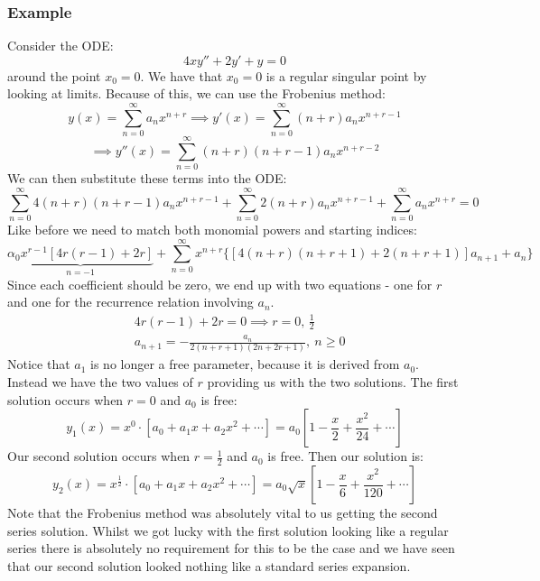 \documentclass[12pt]{article}
\begin{document}
\subsubsection*{Example}
Consider the ODE:
\[4xy''+2y'+y=0\]
around the point \(x_0=0\). We have that \(x_0=0\) is a regular singular point by looking at limits. Because of this, we can use the Frobenius method:
\[y(x)=\sum^\infty_{n=0}a_nx^{n+r}\implies y'(x)=\sum^\infty_{n=0}(n+r)a_nx^{n+r-1}\]
\[\implies y''(x)=\sum^\infty_{n=0}(n+r)(n+r-1)a_nx^{n+r-2}\]
We can then substitute these terms into the ODE:
\[\sum^\infty_{n=0}4(n+r)(n+r-1)a_nx^{n+r-1}+\sum^\infty_{n=0}2(n+r)a_nx^{n+r-1}+\sum^\infty_{n=0}a_nx^{n+r}=0\]
Like before we need to match both monomial powers and starting indices:
\[\underbrace{\alpha_0x^{r-1}[4r(r-1)+2r]}_{n=-1}+\sum^\infty_{n=0}x^{n+r}\{[4(n+r)(n+r+1)+2(n+r+1)]a_{n+1}+a_n\}\]
Since each coefficient should be zero, we end up with two equations - one for \(r\) and one for the recurrence relation involving \(a_n\).
\begin{align*}
    &4r(r-1)+2r=0\implies r=0,\,\frac{1}{2} \\
    &a_{n+1}=-\frac{a_n}{2(n+r+1)(2n+2r+1)},\ n\geq 0
\end{align*}
Notice that \(a_1\) is no longer a free parameter, because it is derived from \(a_0\). Instead we have the two values of \(r\) providing us with the two solutions. The first solution occurs when \(r=0\) and \(a_0\) is free:
\[y_1(x)=x^0\cdot[a_0+a_1x+a_2x^2+\cdots]=a_0\left[1-\frac{x}{2}+\frac{x^2}{24}+\cdots\right]\]
Our second solution occurs when \(r=\frac{1}{2}\) and \(a_0\) is free. Then our solution is:
\[y_2(x)=x^\frac{1}{2}\cdot[a_0+a_1x+a_2x^2+\cdots]=a_0\sqrt{x}\left[1-\frac{x}{6}+\frac{x^2}{120}+\cdots\right]\]
Note that the Frobenius method was absolutely vital to us getting the second series solution. Whilst we got lucky with the first solution looking like a regular series there is absolutely no requirement for this to be the case and we have seen that our second solution looked nothing like a standard series expansion.
\end{document}
